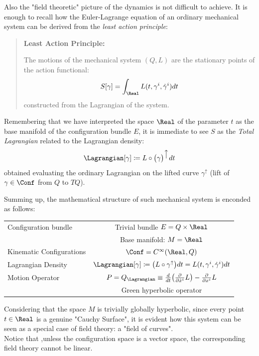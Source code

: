 \documentclass[Main]{subfiles}
\begin{document}
			Also the "field theoretic" picture of the dynamics is not difficult to achieve.
			It is enough to recall how the Euler-Lagrange equation of an ordinary mechanical system can be derived from the \emph{least action principle}:
			\begin{quotation}
				\textbf{Least Action Principle:}
				
				The %
				 motions of the mechanical system $(Q,L)$ are the stationary points of the action functional:
				\begin{displaymath}
					S [\gamma]= \int_\Real L(t,\gamma^i, \dot{\gamma}^i) dt
				\end{displaymath}
				constructed from the Lagrangian of the system.
			\end{quotation}
			Remembering that we have interpreted the space $\Real$ of the parameter $t$ as the base manifold of the configuration bundle $E$, it is immediate to see $S$ as the \emph{Total Lagrangian} related to the Lagrangian density:
			\begin{displaymath}
				\Lagrangian[\gamma] \coloneqq L \circ \big( \gamma \big)^{\big\uparrow} dt
			\end{displaymath}
			obtained evaluating the ordinary Lagrangian on the lifted curve $\gamma^\uparrow$ (lift of $\gamma\in \Conf$ from $Q$ to $TQ$).
		
		Summing up, the mathematical structure of such mechanical system is enconded as follows:
			\begin{center}\begin{tabular}{|l|c|}
			\hline
			Configuration bundle & Trivial bundle  $E= Q \times \Real$\\
													& Base manifold: $M=\Real$\\
			\hline
			Kinematic Configurations &  $\Conf=C^\infty(\Real,Q)$\\
			\hline
			Lagrangian Density		&	$\Lagrangian  [\gamma] \coloneqq \big( L \circ	\gamma^\uparrow \big) dt  = L(t,\gamma^i,\dot{\gamma}^i) dt$\\
			\hline
			Motion Operator			&  $P=Q_\Lagrangian \equiv \frac{d}{dt}\big(\frac{\partial}{\partial \dot{x}^i}L\big)-\frac{\partial}{\partial x^i}L $\\
													& Green hyperbolic operator \\
			\hline
			\end{tabular}\end{center}
			
			Considering that the space $M$ is trivially globally hyperbolic, since every point $t\in\Real$ is a genuine "Cauchy Surface", it is evident how this system can be seen as a special case of field theory: a "field of curves".
			\\
				Notice that ,unless the configuration space is a vector space, the corresponding field theory cannot be linear.
		
\end{document}
